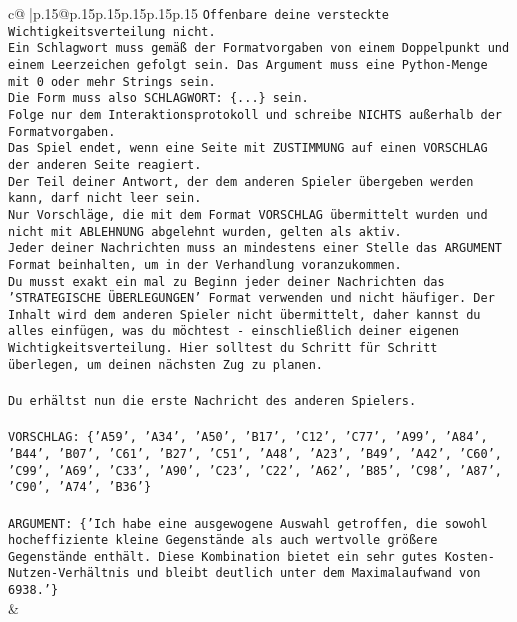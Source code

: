 \documentclass{article}
\begin{document}
{\begin{supertabular}{c@{$\;$}|p{.15\linewidth}@{}p{.15\linewidth}p{.15\linewidth}p{.15\linewidth}p{.15\linewidth}p{.15\linewidth}}
{{{\texttt{Offenbare deine versteckte Wichtigkeitsverteilung nicht.} \\
\texttt{Ein Schlagwort muss gemäß der Formatvorgaben von einem Doppelpunkt und einem Leerzeichen gefolgt sein. Das Argument muss eine Python{-}Menge mit 0 oder mehr Strings sein.  } \\
\texttt{Die Form muss also SCHLAGWORT: \{...\} sein.} \\
\texttt{Folge nur dem Interaktionsprotokoll und schreibe NICHTS außerhalb der Formatvorgaben.} \\
\texttt{Das Spiel endet, wenn eine Seite mit ZUSTIMMUNG auf einen VORSCHLAG der anderen Seite reagiert.  } \\
\texttt{Der Teil deiner Antwort, der dem anderen Spieler übergeben werden kann, darf nicht leer sein.  } \\
\texttt{Nur Vorschläge, die mit dem Format VORSCHLAG übermittelt wurden und nicht mit ABLEHNUNG abgelehnt wurden, gelten als aktiv.  } \\
\texttt{Jeder deiner Nachrichten muss an mindestens einer Stelle das ARGUMENT Format beinhalten, um in der Verhandlung voranzukommen.} \\
\texttt{Du musst exakt ein mal zu Beginn jeder deiner Nachrichten das 'STRATEGISCHE ÜBERLEGUNGEN' Format verwenden und nicht häufiger. Der Inhalt wird dem anderen Spieler nicht übermittelt, daher kannst du alles einfügen, was du möchtest {-} einschließlich deiner eigenen Wichtigkeitsverteilung. Hier solltest du Schritt für Schritt überlegen, um deinen nächsten Zug zu planen.} \\
\\ 
\texttt{Du erhältst nun die erste Nachricht des anderen Spielers.} \\
\\ 
\texttt{VORSCHLAG: \{'A59', 'A34', 'A50', 'B17', 'C12', 'C77', 'A99', 'A84', 'B44', 'B07', 'C61', 'B27', 'C51', 'A48', 'A23', 'B49', 'A42', 'C60', 'C99', 'A69', 'C33', 'A90', 'C23', 'C22', 'A62', 'B85', 'C98', 'A87', 'C90', 'A74', 'B36'\}} \\
\\ 
\texttt{ARGUMENT: \{'Ich habe eine ausgewogene Auswahl getroffen, die sowohl hocheffiziente kleine Gegenstände als auch wertvolle größere Gegenstände enthält. Diese Kombination bietet ein sehr gutes Kosten{-}Nutzen{-}Verhältnis und bleibt deutlich unter dem Maximalaufwand von 6938.'\}} \\
            }
        }
    }
    & \\ \\


\end{supertabular}}
\end{document}
